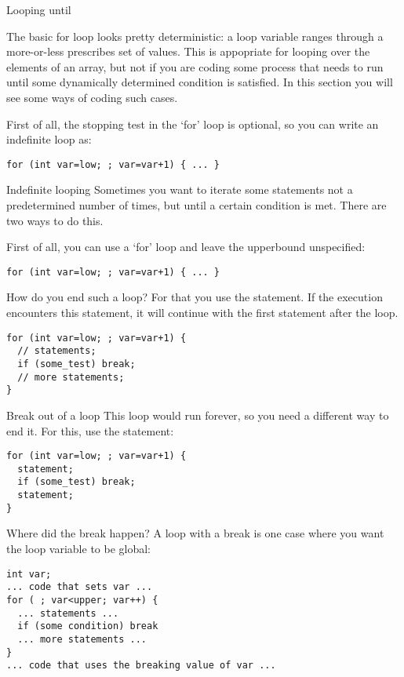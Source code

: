  {Looping until}
\label{sec:loopuntil}

The basic for loop looks pretty deterministic: a loop variable ranges
through a more-or-less prescribes set of values. This is appopriate
for looping over the elements of an array, but not if you are coding
some process that needs to run until some dynamically determined
condition is satisfied. In this section you will see some ways of
coding such cases.

First of all, the stopping test in the `for' loop is optional, so you
can write an indefinite loop as:
\begin{verbatim}
for (int var=low; ; var=var+1) { ... }
\end{verbatim}

\begin{slide}{Indefinite looping}
  \label{sl:for-inf}
  Sometimes you want to iterate some statements not a predetermined
  number of times, but until a certain condition is met. There are two
  ways to do this.

  First of all, you can use a `for' loop and leave the upperbound
  unspecified:
\begin{verbatim}
for (int var=low; ; var=var+1) { ... }
\end{verbatim}
\end{slide}

How do you end such a loop? For that you use the
 statement. If the execution encounters this
statement, it will continue with the first statement after the loop.

\begin{verbatim}
for (int var=low; ; var=var+1) {
  // statements;
  if (some_test) break;
  // more statements;
}
\end{verbatim}

\begin{slide}{Break out of a loop}
  \label{sl:for-break}
  This loop would run forever, so you need a different way to end
  it. For this, use the  statement:
\begin{verbatim}
for (int var=low; ; var=var+1) {
  statement;
  if (some_test) break;
  statement;
}
\end{verbatim}
\end{slide}

\begin{slide}{Where did the break happen?}
  \label{sl:for-break-var}
  A loop with a break is one case where you want the loop variable to
  be global:
\begin{verbatim}
int var;
... code that sets var ...
for ( ; var<upper; var++) {
  ... statements ...
  if (some condition) break
  ... more statements ...
}
... code that uses the breaking value of var ...
\end{verbatim}
\end{slide}


